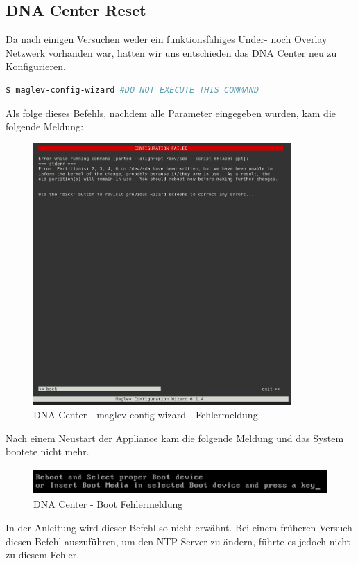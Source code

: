 \subsection{DNA Center Reset}
Da nach einigen Versuchen weder ein funktionsfähiges Under- noch Overlay Netzwerk vorhanden war, hatten wir uns entschieden das DNA Center neu zu Konfigurieren.

\begin{lstlisting}[language=bash]
$ maglev-config-wizard #DO NOT EXECUTE THIS COMMAND
\end{lstlisting}

Als folge dieses Befehls, nachdem alle Parameter eingegeben wurden, kam die folgende Meldung:

\begin{figure}[H]
	\centering
	\includegraphics[height=10cm]{img/dna-center-reset-fail-1.png}
	\caption{DNA Center - maglev-config-wizard - Fehlermeldung}
	\label{fig:dna-center-reset-1}
\end{figure}

Nach einem Neustart der Appliance kam die folgende Meldung und das System bootete nicht mehr. 
\begin{figure}[H]
	\centering
	\includegraphics[height=1cm]{img/dna-center-reset-fail-2.png}
	\caption{DNA Center - Boot Fehlermeldung}
	\label{fig:dna-center-reset-2}
\end{figure}

In der Anleitung wird dieser Befehl so nicht erwähnt. Bei einem früheren Versuch diesen Befehl auszuführen, um den NTP Server zu ändern, führte es jedoch nicht zu diesem Fehler. 

